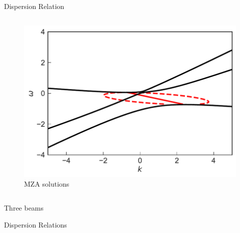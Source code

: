 \documentclass[9pt]{beamer}
\begin{document}
\begin{darkframes}
\begin{frame}{Dispersion Relation}
\begin{columns}[T]
\begin{column}{0.5\textwidth}
   \begin{figure}
      \includegraphics[width=\linewidth]{assets/dr/spectDB3WC4DRDBMZAPltBlob.pdf}
      \caption*{ MZA solutions}
   \end{figure}
\end{column}

   \end{columns}

   \begin{tcolorbox}
      \centering
      Three beams
   \end{tcolorbox}


\end{frame}


\begin{frame}{Dispersion Relations}


\end{frame}
\end{darkframes}
\end{document}
